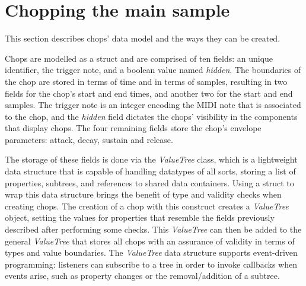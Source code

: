 \documentclass[12pt, a4paper, hidelinks]{report}
\begin{document}
	\section{Chopping the main sample}
	This section describes chops' data model and the ways they can be created. \par
	Chops are modelled as a struct and are comprised of ten fields: an unique identifier, the trigger note, and a boolean value named \textit{hidden}. The boundaries of the chop are stored in terms of time and in terms of samples, resulting in two fields for the chop's start and end times, and another two for the start and end samples. The trigger note is an integer encoding the MIDI note that is associated to the chop, and the \textit{hidden} field dictates the chops' visibility in the components that display chops. The four remaining fields store the chop's envelope parameters: attack, decay, sustain and release. \par 
	The storage of these fields is done via the \textit{ValueTree} \cite{valuetree} class, which is a lightweight data structure that is capable of handling datatypes of all sorts, storing a list of properties, subtrees, and references to shared data containers. Using a struct to wrap this data structure brings the benefit of type and validity checks when creating chops. The creation of a chop with this construct creates a \textit{ValueTree} object, setting the values for properties that resemble the fields previously described after performing some checks. This \textit{ValueTree} can then be added to the general \textit{ValueTree} that stores all chops with an assurance of validity in terms of types and value boundaries. The \textit{ValueTree} data structure supports event-driven programming: listeners can subscribe to a tree in order to invoke callbacks when events arise, such as property changes or the removal/addition of a subtree.
	
	
\end{document}
